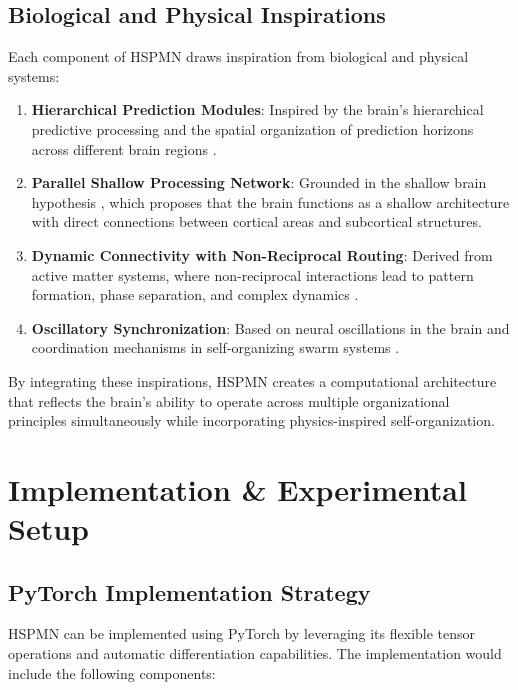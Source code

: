 \documentclass[11pt,a4paper,twocolumn]{article}
\begin{document}
\subsection{Biological and Physical Inspirations}

Each component of HSPMN draws inspiration from biological and physical systems:

\begin{enumerate}
    \item \textbf{Hierarchical Prediction Modules}: Inspired by the brain's hierarchical predictive processing and the spatial organization of prediction horizons across different brain regions \cite{caucheteux2023evidence}.

    \item \textbf{Parallel Shallow Processing Network}: Grounded in the shallow brain hypothesis \cite{suzuki2023shallow}, which proposes that the brain functions as a shallow architecture with direct connections between cortical areas and subcortical structures.

    \item \textbf{Dynamic Connectivity with Non-Reciprocal Routing}: Derived from active matter systems, where non-reciprocal interactions lead to pattern formation, phase separation, and complex dynamics \cite{marchetti2024active, cichos2025roadmap}.

    \item \textbf{Oscillatory Synchronization}: Based on neural oscillations in the brain and coordination mechanisms in self-organizing swarm systems \cite{zhu2024selforganizing}.
\end{enumerate}

By integrating these inspirations, HSPMN creates a computational architecture that reflects the brain's ability to operate across multiple organizational principles simultaneously while incorporating physics-inspired self-organization.

\section{Implementation \& Experimental Setup}

\subsection{PyTorch Implementation Strategy}

HSPMN can be implemented using PyTorch by leveraging its flexible tensor operations and automatic differentiation capabilities. The implementation would include the following components:
\end{document}
